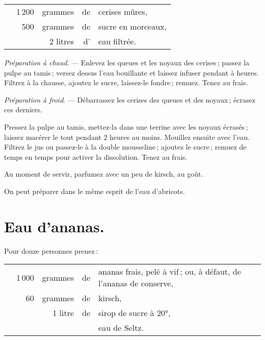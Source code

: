 \footnotesize
\begin{longtable}{rrrrp{16em}}
  & 1 200 & grammes & de & cerises mûres,                                                                 \\
  &   500 & grammes & de & sucre en morceaux,                                                             \\
  & \multicolumn{2}{r}{2 litres} & d' & eau filtrée.                                                      \\
\end{longtable}
\normalsize

\textit{Préparation à chaud}. — Enlevez les queues et les noyaux des cerises ;
passez la pulpe au tamis ; versez dessus l’eau bouillante et laissez infuser
pendant {\mmm} à {\mmm} heures. Filtrez à la chausse, ajoutez le
sucre, laissez-le fondre ; remuez. Tenez au frais.

\medskip

\textit{Préparation à froid}. — Débarrassez les cerises des queues et des
noyaux ; écrasez ces derniers.

Pressez la pulpe au tamis, mettez-la dans une terrine avec les noyaux écrasés ;
laissez macérer le tout pendant 2 heures au moins. Mouillez ensuite avec l'eau.
Filtrez le jus ou passez-le à la double mousseline ; ajoutez le sucre ; remuez
de temps en temps pour activer la dissolution. Tenez au frais.

\medskip

Au moment de servir, parfumez avec un peu de kirsch, au goût.

\sk

On peut préparer dans le même esprit de l'eau d'abricots.

\section*{\centering Eau d'ananas.}
{}

Pour douze personnes prenez :

\footnotesize
\begin{longtable}{rrrrp{16em}}
  & 1 000 & grammes & de & ananas frais, pelé à vif ; ou, à défaut, de l'ananas de conserve,              \\
  &    60 & grammes & de & kirsch,                                                                        \\
  & \multicolumn{2}{r}{1 litre} & de & sirop de sucre à 20°,                                              \\
  &       &         &    & eau de Seltz.                                                                  \\
\end{longtable}
\normalsize

